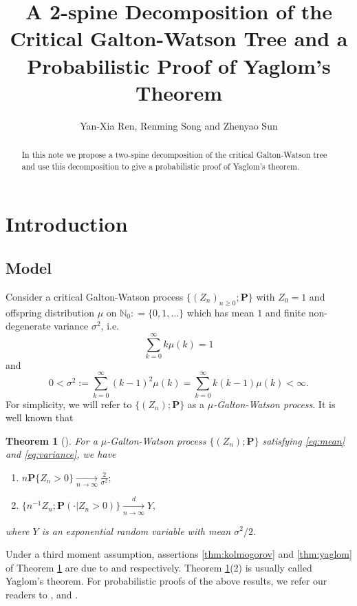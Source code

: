 \documentclass[12pt,a4paper]{amsart}
\title[A 2-spine decomposition and Yaglom's theorem]
{\large A 2-spine Decomposition of the Critical Galton-Watson Tree and a Probabilistic Proof of Yaglom's Theorem}
\author{Yan-Xia Ren, Renming Song and Zhenyao Sun}
\newtheorem{thm}{Theorem}[section]
\numberwithin{equation}{section}
\begin{document}
\begin{abstract}
	In this note  we propose a two-spine decomposition of the critical Galton-Watson tree and use this decomposition to give a probabilistic proof of Yaglom's theorem.
\end{abstract}
\maketitle	
\section{Introduction}
\subsection{Model}
\label{sec:model}
	Consider a critical Galton-Watson process $\{(Z_n)_{n\ge 0}; \mathbf P \}$ with $Z_0 = 1$ and offspring distribution $\mu$ on $\mathbb N_0 : = \{0,1,\dots\}$ which has mean $1$ and finite non-degenerate variance $\sigma^2$, i.e.
\begin{equation}\label{eq:mean}
 \sum_{k=0}^\infty k \mu(k)	=1
\end{equation}
	and
\begin{equation}\label{eq:variance}
	0	
	<	\sigma^2
	:=	\sum_{k=0}^\infty  (k-1)^2 \mu(k)
	=	\sum_{k=0}^\infty k(k-1) \mu(k)
	<	\infty.
\end{equation}
	For simplicity, we will refer to $\{(Z_n); \mathbf P\}$ as 
 a  \emph{$\mu$-Galton-Watson process}. 
	It is well known that
\begin{thm}[\cite{kesten1966galton}] \label{thm: Kolmogrov and Yaglom theorem}
	For a $\mu$-Galton-Watson process $\{(Z_n); \mathbf P\}$ satisfying \eqref{eq:mean} and \eqref{eq:variance}, we have
\begin{enumerate}
\item \label{thm:kolmogorov}
	$n \mathbf P \{Z_n>0\} \xrightarrow[n \to \infty]{} \frac{2}{\sigma^2};$ 
\item \label{thm:yaglom}
	$\{n^{-1}Z_n; \mathbf P(\cdot | Z_n>0)\}\xrightarrow[n \to \infty]{d} Y,$
\end{enumerate}
	where $Y$ is an exponential random variable with mean 
	$\sigma^2/2$.
\end{thm}

	Under a third moment assumption, assertions \eqref{thm:kolmogorov} and \eqref{thm:yaglom} of Theorem \ref{thm: Kolmogrov and Yaglom theorem} are due to \cite{kolmogorov1938losung} and \cite{yaglom1947certain} respectively. 
	Theorem \ref{thm: Kolmogrov and Yaglom theorem}(2) is usually called Yaglom's theorem.
	For probabilistic proofs of the above results, we refer our readers to 
\cite{geiger1999elementary}, \cite{geiger2000new} and \cite{lyons1995conceptual}.
\end{document}
